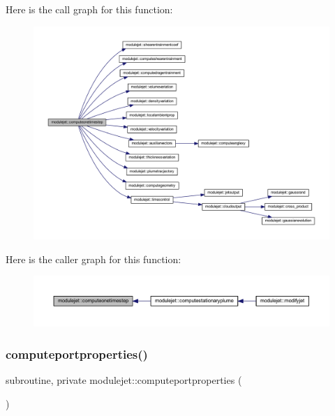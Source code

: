 Here is the call graph for this function\+:\nopagebreak
\begin{figure}[H]
\begin{center}
\leavevmode
\includegraphics[width=350pt]{namespacemodulejet_aa7fe235d6b33c696f614897ed43a1e19_cgraph}
\end{center}
\end{figure}
Here is the caller graph for this function\+:\nopagebreak
\begin{figure}[H]
\begin{center}
\leavevmode
\includegraphics[width=350pt]{namespacemodulejet_aa7fe235d6b33c696f614897ed43a1e19_icgraph}
\end{center}
\end{figure}
\mbox{\label{namespacemodulejet_a6a2424bc396ad0eed996ed0d75430e3b}} 
\subsubsection{\texorpdfstring{computeportproperties()}{computeportproperties()}}
{\footnotesize\ttfamily subroutine, private modulejet\+::computeportproperties (\begin{DoxyParamCaption}{ }\end{DoxyParamCaption})\hspace{0.3cm}{\ttfamily [private]}}

